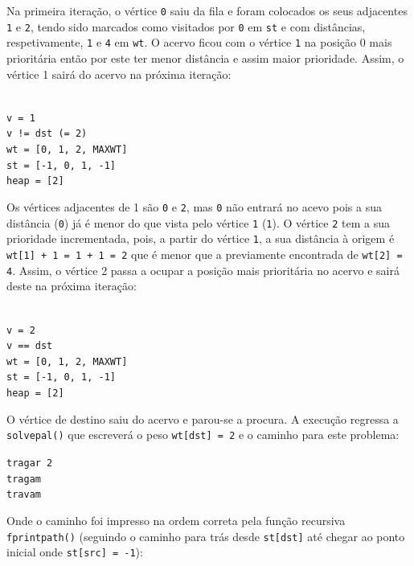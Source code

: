 \documentclass[a4paper, 18pt]{article}
\begin{document}
	\par
	Na primeira iteração, o vértice \texttt{0} saiu da fila e foram colocados os seus adjacentes \texttt{1} e \texttt{2}, tendo sido marcados como visitados por \texttt{0} em \texttt{st} e com distâncias, respetivamente, \texttt{1} e \texttt{4} em \texttt{wt}. O acervo ficou com o vértice \texttt{1} na posição 0 mais prioritária então por este ter menor distância e assim maior prioridade. Assim, o vértice 1 sairá do acervo na próxima iteração:
	\begin{center}
		\begin{minipage}{0.45\linewidth}
			\texttt{\\
			v = 1\\
			v != dst (= 2) \\
			wt = [0, 1, 2, MAX\textunderscore WT] \\
			st = [-1, 0, 1, -1] \\
			heap = [2] \\}
		\end{minipage}
		\hspace{0.05\linewidth}
	\end{center}
	\par
	Os vértices adjacentes de 1 são \texttt{0} e \texttt{2}, mas \texttt{0} não entrará no acevo pois a sua distância (\texttt{0}) já é menor do que vista pelo vértice \texttt{1} (\texttt{1}). O vértice \texttt{2} tem a sua prioridade incrementada, pois, a partir do vértice \texttt{1}, a sua distância à origem é \texttt{wt[1] + 1 = 1 + 1 = 2} que é menor que a previamente encontrada de \texttt{wt[2] = 4}. Assim, o vértice 2 passa a ocupar a posição mais prioritária no acervo e sairá deste na próxima iteração:
	\begin{center}
		\begin{minipage}{0.45\linewidth}
		\texttt{\\
			v = 2 \\
			v == dst \\
			wt = [0, 1, 2, MAX\textunderscore WT] \\
			st = [-1, 0, 1, -1] \\
			heap = [2] \\}
		\end{minipage}
		\hspace{0.05\linewidth}
	\end{center}

	\par
	O vértice de destino saiu do acervo e parou-se a procura. A execução regressa a \texttt{solve\textunderscore pal()} que escreverá o peso \texttt{wt[dst] = 2} e o caminho para este problema:
	\begin{center}
	\begin{minipage}{0.15\linewidth}
		\texttt{tragar 2 \\
				tragam \\
				travam}
	\end{minipage}
	\end{center}
	\par
	Onde o caminho foi impresso na ordem correta pela função recursiva \texttt{fprint\textunderscore path()} (seguindo o caminho para trás desde \texttt{st[dst]} até chegar ao ponto inicial onde \texttt{st[src] = -1}):
\end{document}
